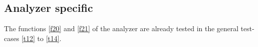 \subsection{Analyzer specific}

The functions  \ref{f20} and \ref{f21} of the analyzer are 
already tested in the general test-cases \ref{t12} to \ref{t14}.



% 
% 
% 
% 
%  
% 
% 
% 
% 
% 
% 
% 
% 
% 
% 
% 
% 
% 
% 
% 
